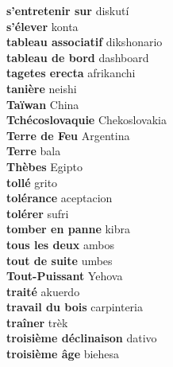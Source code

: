 \textbf{ s’entretenir sur  } diskutí \\
\textbf{ s’élever  } konta \\
\textbf{ tableau associatif  } dikshonario \\
\textbf{ tableau de bord  } dashboard \\
\textbf{ tagetes erecta  } afrikanchi \\
\textbf{ tanière  } neishi \\
\textbf{ Taïwan  } China \\
\textbf{ Tchécoslovaquie  } Chekoslovakia \\
\textbf{ Terre de Feu  } Argentina \\
\textbf{ Terre  } bala \\
\textbf{ Thèbes  } Egipto \\
\textbf{ tollé  } grito \\
\textbf{ tolérance  } aceptacion \\
\textbf{ tolérer  } sufri \\
\textbf{ tomber en panne  } kibra \\
\textbf{ tous les deux  } ambos \\
\textbf{ tout de suite  } umbes \\
\textbf{ Tout-Puissant  } Yehova \\
\textbf{ traité  } akuerdo \\
\textbf{ travail du bois  } carpinteria \\
\textbf{ traîner  } trèk \\
\textbf{ troisième déclinaison  } dativo \\
\textbf{ troisième âge  } biehesa \\
